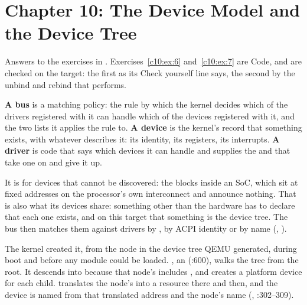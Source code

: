 
\section{Chapter 10: The Device Model and the Device Tree}
\label{sol:sec:c10}
Answers to the exercises in . Exercises~\ref{c10:ex:6} and~\ref{c10:ex:7}
are Code, and are checked on the target: the first as its Check yourself line says, the second by
the unbind and rebind that  performs.


 \textbf{A bus} is a matching policy: the rule by which the kernel decides which of the
drivers registered with it can handle which of the devices registered with it, and the two lists it
applies the rule to. \textbf{A device} is the kernel's record that something exists, with whatever
describes it: its identity, its registers, its interrupts. \textbf{A driver} is code that says which
devices it can handle and supplies the  and  that take one on and give it
up.

 It is for devices that cannot be discovered: the blocks inside an SoC, which sit at fixed
addresses on the processor's own interconnect and announce nothing. That is also what its devices
share: something other than the hardware has to declare that each one exists, and on this target
that something is the device tree. The bus then matches them against drivers by
, by ACPI identity or by name (,
).

 The kernel created it, from the  node in the device tree QEMU generated,
during boot and before any module could be loaded. , an
 (:600), walks the tree from the root. It
descends into  because that node's  includes
, and creates a platform device for each child.  translates
the node's  into a resource there and then, and the device is named 
from that translated address and the node's name (,
:302--309).


